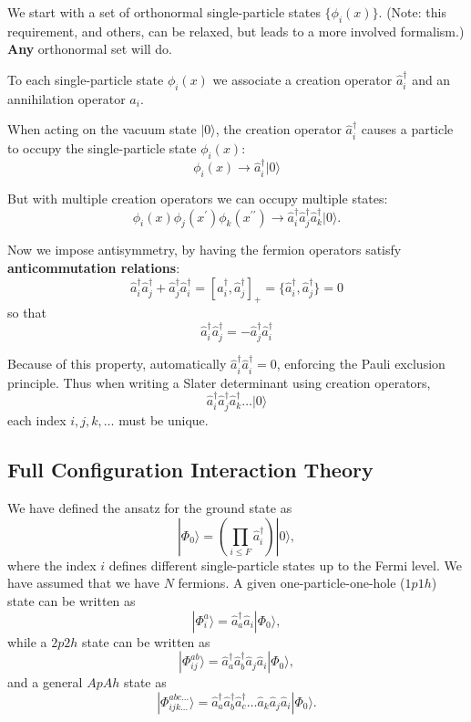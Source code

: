 \documentclass[%
twoside,                 %
final,                   %
10pt]{article}
\begin{document}
We start with a set of orthonormal single-particle states $\{ \phi_i(x) \}$. 
(Note: this requirement, and others, can be relaxed, but leads to a 
more involved formalism.) \textbf{Any} orthonormal set will do. 

To each single-particle state $\phi_i(x)$ we associate a creation operator 
$\hat{a}^\dagger_i$ and an annihilation operator $\hat{a}_i$. 

When acting on the vacuum state $| 0 \rangle$, the creation operator $\hat{a}^\dagger_i$ causes 
a particle to occupy the single-particle state $\phi_i(x)$:
\[
\phi_i(x) \rightarrow \hat{a}^\dagger_i |0 \rangle
\]



But with multiple creation operators we can occupy multiple states:
\[
\phi_i(x) \phi_j(x^\prime) \phi_k(x^{\prime \prime}) 
\rightarrow \hat{a}^\dagger_i \hat{a}^\dagger_j \hat{a}^\dagger_k |0 \rangle.
\]

Now we impose antisymmetry, by having the fermion operators satisfy  \textbf{anticommutation relations}:
\[
\hat{a}^\dagger_i \hat{a}^\dagger_j + \hat{a}^\dagger_j \hat{a}^\dagger_i
= [ \hat{a}^\dagger_i ,\hat{a}^\dagger_j ]_+ 
= \{ \hat{a}^\dagger_i ,\hat{a}^\dagger_j \} = 0
\]
so that 
\[
\hat{a}^\dagger_i \hat{a}^\dagger_j = - \hat{a}^\dagger_j \hat{a}^\dagger_i
\]




Because of this property, automatically $\hat{a}^\dagger_i \hat{a}^\dagger_i = 0$, 
enforcing the Pauli exclusion principle.  Thus when writing a Slater determinant 
using creation operators, 
\[
\hat{a}^\dagger_i \hat{a}^\dagger_j \hat{a}^\dagger_k \ldots |0 \rangle
\]
each index $i,j,k, \ldots$ must be unique.




\subsection{Full Configuration Interaction Theory}

We have defined the ansatz for the ground state as 
\[
|\Phi_0\rangle = \left(\prod_{i\le F}\hat{a}_{i}^{\dagger}\right)|0\rangle,
\]
where the index $i$ defines different single-particle states up to the Fermi level. We have assumed that we have $N$ fermions. 
A given one-particle-one-hole ($1p1h$) state can be written as
\[
|\Phi_i^a\rangle = \hat{a}_{a}^{\dagger}\hat{a}_i|\Phi_0\rangle,
\]
while a $2p2h$ state can be written as
\[
|\Phi_{ij}^{ab}\rangle = \hat{a}_{a}^{\dagger}\hat{a}_{b}^{\dagger}\hat{a}_j\hat{a}_i|\Phi_0\rangle,
\]
and a general $ApAh$ state as 
\[
|\Phi_{ijk\dots}^{abc\dots}\rangle = \hat{a}_{a}^{\dagger}\hat{a}_{b}^{\dagger}\hat{a}_{c}^{\dagger}\dots\hat{a}_k\hat{a}_j\hat{a}_i|\Phi_0\rangle.
\]
\end{document}
